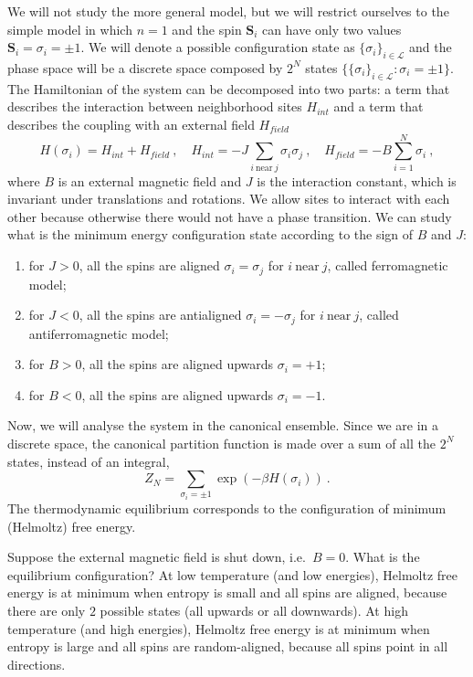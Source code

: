     We will not study the more general model, but we will restrict ourselves to the simple model in which $n = 1$ and the spin $\mathbf S_i$ can have only two values $\mathbf S_i = \sigma_i = \pm 1$. We will denote a possible configuration state as $\{\sigma_i\}_{i \in \mathcal L}$ and the phase space will be a discrete space composed by $2^N$ states $\{\{\sigma_i\}_{i \in \mathcal L} \colon \sigma_i = \pm 1\}$. The Hamiltonian of the system can be decomposed into two parts: a term that describes the interaction between neighborhood sites $H_{int}$ and a term that describes the coupling with an external field $H_{field}$ 
    \begin{equation*}
        H(\sigma_i) = H_{int} + H_{field} ~, \quad H_{int} = - J \sum_{i~\text{near}~j} \sigma_i \sigma_j ~, \quad H_{field} = - B \sum_{i=1}^{N} \sigma_i ~,
    \end{equation*}
    where $B$ is an external magnetic field and $J$ is the interaction constant, which is invariant under translations and rotations. We allow  sites to interact with each other because otherwise there would not have a phase transition.
    We can study what is the minimum energy configuration state according to the sign of $B$ and $J$:
    \begin{enumerate}
        \item for $J > 0$, all the spins are aligned $\sigma_i = \sigma_j$ for $i~\text{near}~j$, called ferromagnetic model;
        \item for $J < 0$, all the spins are antialigned $\sigma_i = - \sigma_j$ for $i~\text{near}~j$, called antiferromagnetic model;
        \item for $B > 0$, all the spins are aligned upwards $\sigma_i = + 1$;
        \item for $B < 0$, all the spins are aligned upwards $\sigma_i = - 1$. 
    \end{enumerate}
    Now, we will analyse the system in the canonical ensemble. Since we are in a discrete space, the canonical partition function is made over a sum of all the $2^N$ states, instead of an integral,
    \begin{equation*}
        Z_N = \sum_{\sigma_i = \pm 1} \exp(- \beta H(\sigma_i)) ~.
    \end{equation*}
    The thermodynamic equilibrium corresponds to the configuration of minimum (Helmoltz) free energy.

    Suppose the external magnetic field is shut down, i.e.~$B = 0$. What is the equilibrium configuration? At low temperature (and low energies), Helmoltz free energy is at minimum when entropy is small and all spins are aligned, because there are only $2$ possible states (all upwards or all downwards). At high temperature (and high energies), Helmoltz free energy is at minimum when entropy is large and all spins are random-aligned, because all spins point in all directions. 
    
